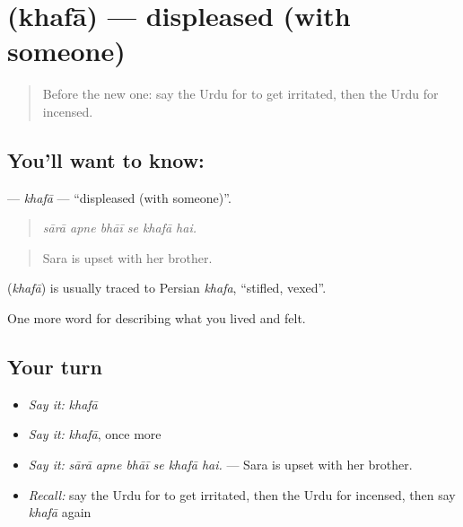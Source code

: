\section[\texorpdfstring{\ur{خفا} (khafā)}{خفا (khafā)}]{ (khafā) — displeased (with someone)}

\label{lesson:UR-C444-khafa}



\begin{quote}
Before the new one: say the Urdu for to get irritated, then the Urdu for incensed.
\end{quote}

\subsection*{You'll want to know: }
\textbf{} — \emph{khafā} — \textquotedblleft{}displeased (with someone)\textquotedblright{}.

\begin{quote}
     
\end{quote}

\begin{quote}
\emph{sārā apne bhāī se khafā hai.}
\end{quote}

\begin{quote}
Sara is upset with her brother.
\end{quote}

\begin{cousinweb}
\textbf{} (\emph{khafā}) is usually traced to Persian \emph{khafa}, \textquotedblleft{}stifled, vexed\textquotedblright{}.
\end{cousinweb}

\begin{grammarlens}[title={What you've built}]
One more word for describing what you lived and felt.
\end{grammarlens}

\subsection*{Your turn}
\begin{itemize}
\raggedright
  \item \emph{Say it:} \emph{khafā}
  \item \emph{Say it:} \emph{khafā}, once more
  \item \emph{Say it:} \emph{sārā apne bhāī se khafā hai.} — Sara is upset with her brother.
  \item \emph{Recall:} say the Urdu for to get irritated, then the Urdu for incensed, then say \emph{khafā} again
\end{itemize}


